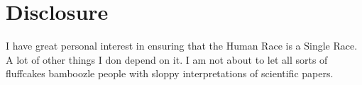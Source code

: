 \documentclass{amsart}
\begin{document}
\section{Disclosure}

I have great personal interest in ensuring that the Human Race is a Single Race.  A lot of other things I don depend on it.  I am not about to let all sorts of fluffcakes bamboozle people with sloppy interpretations of scientific papers.


\begin{thebibliography}{CCC}
\end{thebibliography}
\end{document}

